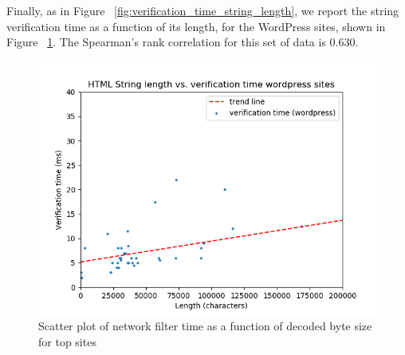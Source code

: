 Finally, as in Figure ~\ref{fig:verification_time_string_length}, we report the string verification time as a function of its length, for the WordPress sites, shown in Figure ~\ref{fig:verification_time_string_length_wordpress}. The Spearman's rank correlation for this set of data is 0.630. 

\begin{figure}[h]
	\includegraphics[scale=0.5]{results/string_length_vs_verification_time_wordpress}
	\caption{Scatter plot of network filter time as a function of decoded byte size for top sites}
	\label{fig:verification_time_string_length_wordpress}
\end{figure}